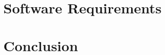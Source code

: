 \documentclass{InsightArticle}
\begin{document}
\subsection{}

%
\section{Software Requirements}
%
\section{Conclusion}
%
%
\appendix

%
%



\end{document}
